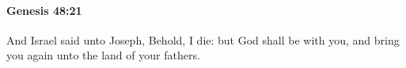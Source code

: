 
		\paragraph{Genesis 48:21} %
			\label{GENESIS-48-21}

			And Israel said unto Joseph, Behold, I die: but God shall be with you, and bring you again unto the land of your fathers.


